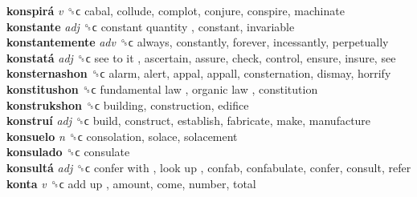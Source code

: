 \textbf{konspirá} \emph{v}  ␝ϲ  cabal, collude, complot, conjure, conspire, machinate  \\
\textbf{konstante} \emph{adj}  ␝ϲ   constant quantity , constant, invariable  \\
\textbf{konstantemente} \emph{adv}  ␝ϲ  always, constantly, forever, incessantly, perpetually  \\
\textbf{konstatá} \emph{adj}  ␝ϲ   see to it , ascertain, assure, check, control, ensure, insure, see  \\
\textbf{konsternashon} ␝ϲ  alarm, alert, appal, appall, consternation, dismay, horrify  \\
\textbf{konstitushon} ␝ϲ   fundamental law ,  organic law , constitution  \\
\textbf{konstrukshon} ␝ϲ  building, construction, edifice  \\
\textbf{konstruí} \emph{adj}  ␝ϲ  build, construct, establish, fabricate, make, manufacture  \\
\textbf{konsuelo} \emph{n}  ␝ϲ  consolation, solace, solacement  \\
\textbf{konsulado} ␝ϲ  consulate  \\
\textbf{konsultá} \emph{adj}  ␝ϲ   confer with ,  look up , confab, confabulate, confer, consult, refer  \\
\textbf{konta} \emph{v}  ␝ϲ   add up , amount, come, number, total  \\
